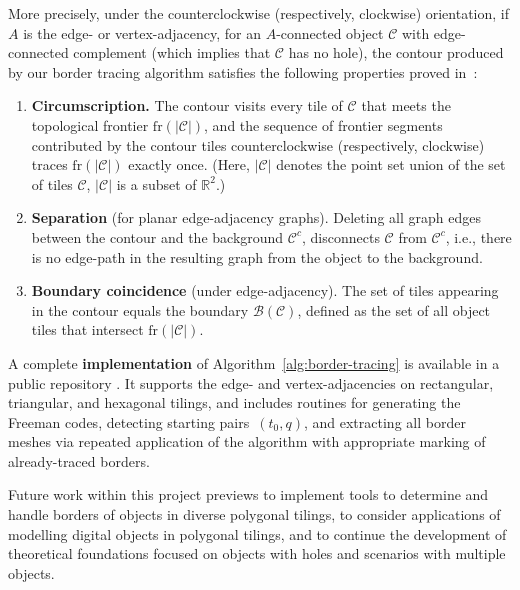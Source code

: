 More precisely, under the counterclockwise (respectively, clockwise) orientation, if $A$ is the edge- or vertex-adjacency, for an $A$-connected object $\mathcal{C}$ with edge-connected complement (which implies that $\mathcal{C}$ has no hole), the contour produced by our border tracing algorithm satisfies the following properties proved in~\cite{WiederholdMatosWiederhold2026}:
\begin{enumerate}
    \item \textbf{Circumscription.}
    The contour visits every tile of $\mathcal{C}$ that meets the topological frontier $\mathrm{fr}(|\mathcal{C}|)$, and the sequence of frontier segments contributed by the contour tiles counterclockwise (respectively, clockwise) traces $\mathrm{fr}(|\mathcal{C}|)$ exactly once. (Here, $|\mathcal{C}|$ denotes the point set union of the set of tiles $\mathcal{C}$, $|\mathcal{C}|$ is a subset of $\mathbb{R}^2$.)

    \item \textbf{Separation} (for planar edge-adjacency graphs).
    Deleting all graph edges between the contour and the background $\mathcal{C}^c$, disconnects $\mathcal{C}$ from $\mathcal{C}^c$, i.e., there is no edge-path in the resulting graph from the object to the background.
    
    \item \textbf{Boundary coincidence} (under edge-adjacency).
    The set of tiles appearing in the contour equals the boundary $\mathcal{B}(\mathcal{C})$, defined as the set of all object tiles that intersect $\mathrm{fr}(|\mathcal{C}|)$.
\end{enumerate}


A complete \textbf{implementation} of Algorithm~\ref{alg:border-tracing} is available in a public repository \cite{wiederhold2026border_repo}.
It supports the edge- and vertex-adjacencies on rectangular, triangular, and hexagonal tilings, and includes routines for generating the Freeman codes, detecting starting pairs~$(t_0, q)$, and extracting all border meshes via repeated application of the algorithm with appropriate marking of already-traced borders.

Future work within this project previews to implement tools to determine and handle borders of objects in diverse polygonal tilings, to consider applications of modelling digital objects in polygonal tilings, and to continue the development of theoretical foundations focused on objects with holes and scenarios with multiple objects.
 
%